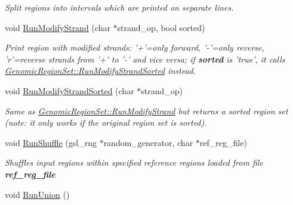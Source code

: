 \begin{DoxyCompactItemize}
\begin{DoxyCompactList}\small\item\em Split regions into intervals which are printed on separate lines. \end{DoxyCompactList}\item 
\hypertarget{classGenomicRegionSet_af1146729843b82d7637e0adc1b07e51a}{
void \hyperlink{classGenomicRegionSet_af1146729843b82d7637e0adc1b07e51a}{RunModifyStrand} (char $\ast$strand\_\-op, bool sorted)}
\label{classGenomicRegionSet_af1146729843b82d7637e0adc1b07e51a}

\begin{DoxyCompactList}\small\item\em Print region with modified strands: '+'=only forward, '-\/'=only reverse, 'r'=reverse strands from '+' to '-\/' and vice versa; if {\bfseries sorted} is 'true', it calls \hyperlink{classGenomicRegionSet_a7c0a328896b88a0c837f60e89fd85584}{GenomicRegionSet::RunModifyStrandSorted} instead. \end{DoxyCompactList}\item 
\hypertarget{classGenomicRegionSet_a7c0a328896b88a0c837f60e89fd85584}{
void \hyperlink{classGenomicRegionSet_a7c0a328896b88a0c837f60e89fd85584}{RunModifyStrandSorted} (char $\ast$strand\_\-op)}
\label{classGenomicRegionSet_a7c0a328896b88a0c837f60e89fd85584}

\begin{DoxyCompactList}\small\item\em Same as \hyperlink{classGenomicRegionSet_af1146729843b82d7637e0adc1b07e51a}{GenomicRegionSet::RunModifyStrand} but returns a sorted region set (note: it only works if the original region set is sorted). \end{DoxyCompactList}\item 
\hypertarget{classGenomicRegionSet_a015049fd0bd08587cbdbb49332ee352d}{
void \hyperlink{classGenomicRegionSet_a015049fd0bd08587cbdbb49332ee352d}{RunShuffle} (gsl\_\-rng $\ast$random\_\-generator, char $\ast$ref\_\-reg\_\-file)}
\label{classGenomicRegionSet_a015049fd0bd08587cbdbb49332ee352d}

\begin{DoxyCompactList}\small\item\em Shuffles input regions within specified reference regions loaded from file {\bfseries ref\_\-reg\_\-file} \end{DoxyCompactList}\item 
\hypertarget{classGenomicRegionSet_ab281c8ab57c4181a06161182031c9df4}{
void \hyperlink{classGenomicRegionSet_ab281c8ab57c4181a06161182031c9df4}{RunUnion} ()}
\label{classGenomicRegionSet_ab281c8ab57c4181a06161182031c9df4}


\end{DoxyCompactItemize}
